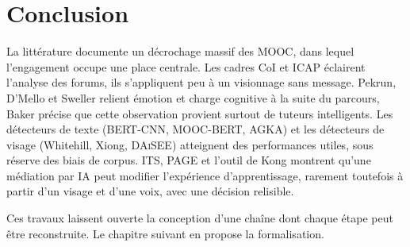 \section{Conclusion}
\label{sec:ea-concl}

La littérature documente un décrochage massif des MOOC, dans lequel
l'engagement occupe une place centrale. Les cadres CoI et ICAP éclairent
l'analyse des forums, ils s'appliquent peu à un visionnage sans
message. Pekrun, D'Mello et Sweller relient émotion et charge cognitive
à la suite du parcours, Baker précise que cette observation provient
surtout de tuteurs intelligents. Les détecteurs de texte (BERT-CNN,
MOOC-BERT, AGKA) et les détecteurs de visage (Whitehill, Xiong,
\textsc{DAiSEE}) atteignent des performances utiles, sous réserve des
biais de corpus. ITS, PAGE et l'outil de Kong montrent qu'une médiation
par IA peut modifier l'expérience d'apprentissage, rarement toutefois à
partir d'un visage et d'une voix, avec une décision relisible.

Ces travaux laissent ouverte la conception d'une chaîne dont chaque
étape peut être reconstruite. Le chapitre suivant en propose la
formalisation.

